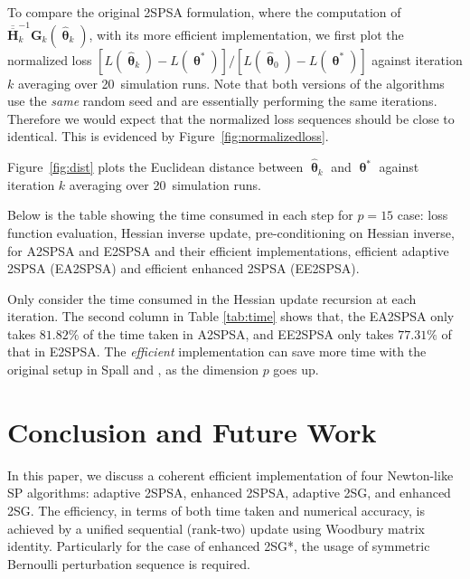 \documentclass[conference,10.6cpt]{IEEEtran}
\newcommand{\bG}{\bm{G}}
\newcommand{\ooH}{\bm{\overline{\overline{H}}}}
\newcommand{\htheta}{\bm{\hat{\uptheta}}}
\begin{document}
\newcommand{\nruns}[0]{20\ }
To compare the original 2SPSA formulation, where the computation of $\ooH_k^{-1}
\bG_k(\htheta_k)$, with its more efficient
implementation, we first plot the normalized loss
$[L(\htheta_k)-L(\bm{\uptheta}^{*})]/[L(\htheta_0)-L(\bm{\uptheta}^{*})]$
against iteration $k$ averaging over \nruns simulation runs. Note that
both versions of the algorithms use the \textit{same} random seed and
are essentially performing the same iterations. Therefore we would expect
that the normalized loss sequences should be close to identical. This is evidenced by Figure~\ref{fig:normalizedloss}.

Figure~\ref{fig:dist} plots the Euclidean distance between
$\htheta_k$ and $\bm{\uptheta}^{*}$ against iteration $k$ averaging
over \nruns simulation runs.


Below is the table showing the time consumed in each step for $p=15$ case:
loss function evaluation, Hessian inverse update, pre-conditioning on
Hessian inverse, for A2SPSA and E2SPSA and their efficient implementations, efficient adaptive 2SPSA (EA2SPSA) and efficient enhanced 2SPSA (EE2SPSA).

\begin{table}[htbp]
	\centering
		\caption{Time Consumed in Each Procedure}
		\label{tab:time}
	\end{table}

Only consider the time consumed in the Hessian update recursion at each iteration. The second column in Table \ref{tab:time} shows that, the EA2SPSA only takes $81.82\%$ of the time taken in A2SPSA, and EE2SPSA only takes $77.31\%$ of that in E2SPSA. The \textit{efficient} implementation can save more time with the original setup in Spall \cite{Spall2000} and \cite{Spall2009}, as the dimension $p$ goes up. 


\section{Conclusion and Future Work} In this paper, we discuss
a coherent efficient implementation of four Newton-like SP algorithms:
adaptive 2SPSA, enhanced 2SPSA, adaptive 2SG, and enhanced 2SG. The
efficiency, in terms of both time taken and numerical accuracy, is
achieved by a unified sequential (rank-two) update using Woodbury
matrix identity. Particularly for the case of enhanced 2SG*, the
usage of symmetric Bernoulli perturbation sequence is required.
\end{document}
